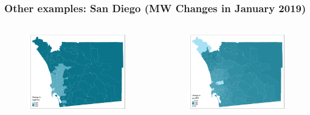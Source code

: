 \documentclass[aspectratio=169, t]{beamer}
\begin{document}
\begin{frame}[label = san_diego_example]
\frametitle{Other examples: San Diego (MW Changes in January 2019)}
    \begin{columns}
        \begin{column}{0.50\textwidth}
            \vspace{-4mm}
            \begin{figure}
                \centering
                \includegraphics[scale = 0.36]{maps_events/output/san_diego_2018-12_actual_mw.png}
            \end{figure}   
        \end{column}
        \begin{column}{0.50\textwidth}
            \vspace{-4mm}
            \begin{figure}
                \centering
                \includegraphics[scale = 0.36]{maps_events/output/san_diego2018-12_exp_mw.png}
            \end{figure}   
        \end{column}
    \end{columns}
     \hyperlink{chi_example}{}
\end{frame}
\end{document}

